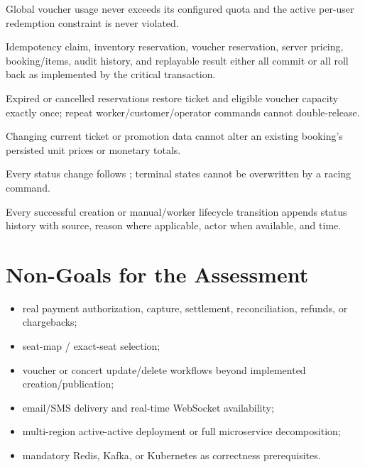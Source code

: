 \begin{invariantbox}
Global voucher usage never exceeds its configured quota and the active
per-user redemption constraint is never violated.
\end{invariantbox}

\begin{invariantbox}
Idempotency claim, inventory reservation, voucher reservation, server pricing,
booking/items, audit history, and replayable result either all commit or all
roll back as implemented by the critical transaction.
\end{invariantbox}

\begin{invariantbox}
Expired or cancelled reservations restore ticket and eligible voucher capacity
exactly once; repeat worker/customer/operator commands cannot double-release.
\end{invariantbox}

\begin{invariantbox}
Changing current ticket or promotion data cannot alter an existing booking's
persisted unit prices or monetary totals.
\end{invariantbox}

\begin{invariantbox}
Every status change follows ;
terminal states cannot be overwritten by a racing command.
\end{invariantbox}

\begin{invariantbox}
Every successful creation or manual/worker lifecycle transition appends status
history with source, reason where applicable, actor when available, and time.
\end{invariantbox}

\section{Non-Goals for the Assessment}
\begin{itemize}[nosep,leftmargin=*]
  \item real payment authorization, capture, settlement, reconciliation, refunds, or chargebacks;
  \item seat-map / exact-seat selection;
  \item voucher or concert update/delete workflows beyond implemented creation/publication;
  \item email/SMS delivery and real-time WebSocket availability;
  \item multi-region active-active deployment or full microservice decomposition;
  \item mandatory Redis, Kafka, or Kubernetes as correctness prerequisites.
\end{itemize}
